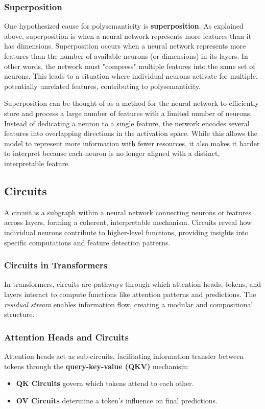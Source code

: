 \documentclass[sigconf,authoryear]{acmart}
\begin{document}
\subsubsection{Superposition}
One hypothesized cause for polysemanticity is \textbf{superposition}. As explained above, superposition is when a neural network represents more features than it has dimensions. Superposition occurs when a neural network represents more features than the number of available neurons (or dimensions) in its layers. In other words, the network must "compress" multiple features into the same set of neurons. This leads to a situation where individual neurons activate for multiple, potentially unrelated features, contributing to polysemanticity.

Superposition can be thought of as a method for the neural network to efficiently store and process a large number of features with a limited number of neurons. Instead of dedicating a neuron to a single feature, the network encodes several features into overlapping directions in the activation space. While this allows the model to represent more information with fewer resources, it also makes it harder to interpret because each neuron is no longer aligned with a distinct, interpretable feature.

\subsection{Circuits}
A circuit is a subgraph within a neural network connecting neurons or features across layers, forming a coherent, interpretable mechanism. Circuits reveal how individual neurons contribute to higher-level functions, providing insights into specific computations and feature detection patterns.

\subsubsection{Circuits in Transformers}
In transformers, circuits are pathways through which attention heads, tokens, and layers interact to compute functions like attention patterns and predictions. The \textit{residual stream} enables information flow, creating a modular and compositional structure.

\subsubsection{Attention Heads and Circuits}
Attention heads act as sub-circuits, facilitating information transfer between tokens through the \textbf{query-key-value (QKV)} mechanism:
\begin{itemize}
    \item \textbf{QK Circuits} govern which tokens attend to each other.
    \item \textbf{OV Circuits} determine a token's influence on final predictions.
\end{itemize}
\end{document}
